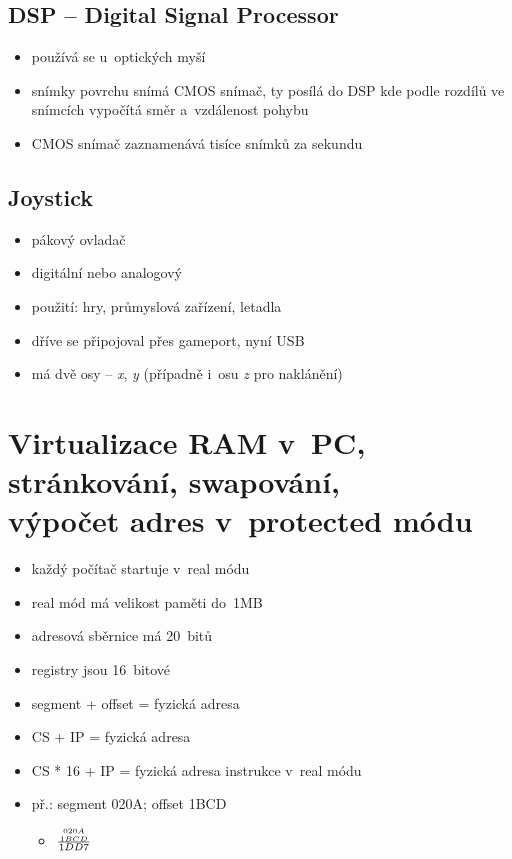 \documentclass[a4paper,12pt]{article}
\providecommand{\tightlist}{%
\setlength{\itemsep}{0pt}\setlength{\parskip}{0pt}}
\begin{document}
\subsection{DSP -- Digital Signal Processor}

\begin{itemize}
\tightlist
\item používá se u~optických myší
\item snímky povrchu snímá CMOS snímač, ty posílá do DSP kde podle rozdílů ve
snímcích vypočítá směr a~vzdálenost pohybu
\item CMOS snímač zaznamenává tisíce snímků za sekundu
\end{itemize}

\subsection{Joystick}

\begin{itemize}
\tightlist
\item pákový ovladač
\item digitální nebo analogový
\item použití: hry, průmyslová zařízení, letadla
\item dříve se připojoval přes gameport, nyní USB
\item má dvě osy -- \emph{x}, \emph{y} (případně i~osu \emph{z} pro
  naklánění)
\end{itemize}

\section{Virtualizace RAM v~PC, stránkování, swapování,\\výpočet adres v~protected módu}

\begin{itemize}
\tightlist
\item každý počítač startuje v~real módu
\item real mód má velikost paměti do~1MB
\item adresová sběrnice má 20~bitů
\item registry jsou 16~bitové
\item segment + offset = fyzická adresa
\item CS + IP = fyzická adresa
\item CS * 16 + IP = fyzická adresa instrukce v~real módu
\item př.: segment 020A; offset 1BCD

  \begin{itemize}
  \tightlist
    \item[] $\frac{{{020A} \atop {1BCD}}}{1DD7}$
  \end{itemize}
\end{itemize}
\end{document}
